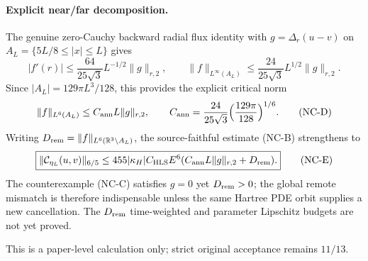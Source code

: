 \paragraph{Explicit near/far decomposition.}
The genuine zero-Cauchy backward radial flux identity with
$g=\Delta_r(u-v)$ on $A_L=\{5L/8\le|x|\le L\}$ gives
\[
 |f'(r)|\le\frac{64}{25\sqrt3}L^{-1/2}\|g\|_{r,2},
 \qquad
 \|f\|_{L^\infty(A_L)}
 \le\frac{24}{25\sqrt3}L^{1/2}\|g\|_{r,2}.
\]
Since $|A_L|=129\pi L^3/128$, this provides the explicit
critical norm
\[
 \|f\|_{L^6(A_L)}
 \le C_{\rm ann}L\|g\|_{r,2},\qquad
 C_{\rm ann}=\frac{24}{25\sqrt3}
 \Bigl(\frac{129\pi}{128}\Bigr)^{1/6}.
 \tag{NC-D}
\]
Writing
$D_{\rm rem}=\|f\|_{L^6(\mathbb R^3\setminus A_L)}$,
the source-faithful estimate (NC-B) strengthens to
\[
 \boxed{
 \|\mathcal C_{\eta_L}(u,v)\|_{6/5}
 \le 455|\kappa_H|C_{\mathrm{HLS}}E^6
  (C_{\rm ann}L\|g\|_{r,2}+D_{\rm rem}).
 }\tag{NC-E}
\]
The counterexample (NC-C) satisfies $g=0$ yet
$D_{\rm rem}>0$; the global remote mismatch is therefore
indispensable unless the same Hartree PDE orbit supplies a
new cancellation. The $D_{\rm rem}$ time-weighted and parameter
Lipschitz budgets are not yet proved.

This is a paper-level calculation
only; strict original acceptance remains $11/13$.
